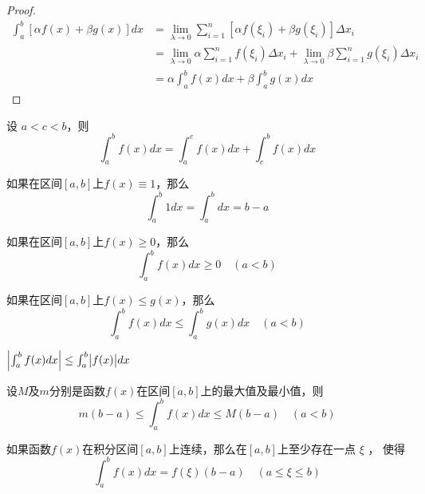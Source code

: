 \documentclass[11pt]{article}
\begin{document}
\begin{proof}
\begin{align*}
\int_a^b[\alpha f(x)+\beta g(x)]dx&=\lim_{\lambda\to0}\sum_{i=1}^n[\alpha f(\xi_i)+\beta g(\xi_i)]\Delta x_i\\
&=\lim_{\lambda\to0}\alpha\sum_{i=1}^nf(\xi_i)\Delta x_i+
\lim_{\lambda\to0}\beta\sum_{i=1}^n g(\xi_i)\Delta x_i\\
&=\alpha\int_a^bf(x)dx+\beta\int_a^bg(x)dx
\end{align*}
\end{proof}

\begin{proposition}[]
设 \(a<c<b\)，则
\begin{equation*}
\int_a^bf(x)dx=\int_a^cf(x)dx+\int_c^bf(x)dx
\end{equation*}
\end{proposition}

\begin{proposition}[]
如果在区间\([a,b]\)上\(f(x)\equiv1\)，那么
\begin{equation*}
\int_a^b1dx=\int_a^bdx=b-a
\end{equation*}
\end{proposition}

\begin{proposition}[]
如果在区间\([a,b]\)上\(f(x)\ge0\)，那么
\begin{equation*}
\int_a^bf(x)dx\ge0\quad(a<b)
\end{equation*}
\end{proposition}

\begin{corollary}[]
如果在区间\([a,b]\)上\(f(x)\le g(x)\)，那么
\begin{equation*}
\int_a^bf(x)dx\le\int_a^bg(x)dx\quad(a<b)
\end{equation*}
\end{corollary}

\begin{corollary}[]
\(\abs{\int_a^bf(x)dx}\le\int_a^b\abs{f(x)}dx\)
\end{corollary}

\begin{proposition}[]
设\(M\)及\(m\)分别是函数\(f(x)\)在区间\([a,b]\)上的最大值及最小值，则
\begin{equation*}
m(b-a)\le\int_a^bf(x)dx\le M(b-a)\quad(a<b)
\end{equation*}
\end{proposition}

\begin{theorem}[定积分中值定理]
如果函数\(f(x)\)在积分区间\([a,b]\)上连续，那么在\([a,b]\)上至少存在一点 \(\xi\) ，
使得
\begin{equation*}
\int_a^bf(x)dx=f(\xi)(b-a)\quad(a\le\xi\le b)
\end{equation*}
\end{theorem}
\end{document}
